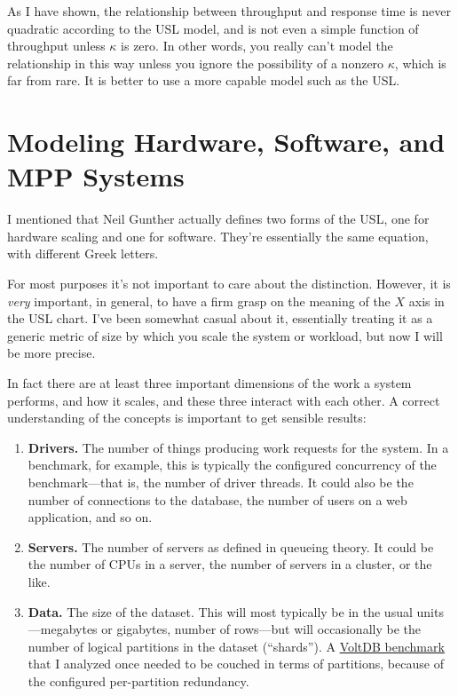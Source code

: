 \documentclass{vivid_layout}
\begin{document}
As I have shown, the relationship between throughput and response time is never
quadratic according to the USL model, and is not even a simple function of
throughput unless $\kappa$ is zero.  In other words, you really can't model the
relationship in this way unless you ignore the possibility of a nonzero
$\kappa$, which is far from rare. It is better to use a more capable model such
as the USL.

\newpage
\section{Modeling Hardware, Software, and MPP Systems}

I mentioned that Neil Gunther actually defines two forms of the USL, one for
hardware scaling and one for software. They're essentially the same equation,
with different Greek letters.

For most purposes it's not important to care about the distinction. However, it
is {\itshape very} important, in general, to have a firm grasp on the meaning of
the $X$ axis in the USL chart. I've been somewhat casual about it, essentially
treating it as a generic metric of size by which you scale the system or
workload, but now I will be more precise.

In fact there are at least three important dimensions of the work a system
performs, and how it scales, and these three interact with each other. A correct
understanding of the concepts is important to get sensible results:

\begin{enumerate}
\item {\bfseries Drivers.} The number of things producing work requests for the
system. In a benchmark, for example, this is typically the configured
concurrency of the benchmark---that is, the number of driver threads. It could
also be the number of connections to the database, the number of users on a web
application, and so on.
\item {\bfseries Servers.} The number of servers as defined in queueing theory. It could be the
number of CPUs in a server, the number of servers in a cluster, or the like.
\item {\bfseries Data.} The size of the dataset. This will most typically be in the usual
units---megabytes or gigabytes, number of rows---but will occasionally be the
number of logical partitions in the dataset (``shards''). A
\href{https://www.percona.com/blog/2011/02/28/is-voltdb-really-as-scalable-as-they-claim/}{VoltDB
benchmark} that I analyzed once needed to be couched in terms of partitions,
because of the configured per-partition redundancy.
\end{enumerate}
\end{document}
